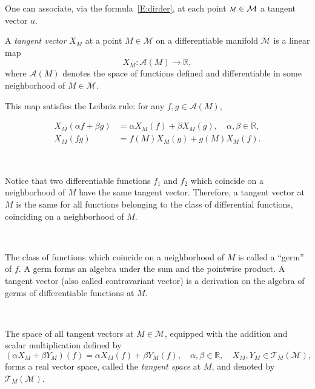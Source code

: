One can associate, via the formula~\eqref{E:dirder}, at each point ${\scriptstyle M}\in \mathcal{M}$ a tangent vector $u$.

\begin{definition}
A \emph{tangent vector} \( X_{\scriptstyle M} \) at a point \( {\scriptstyle M} \in \mathcal{M} \) on a differentiable manifold \( \mathcal{M} \) is a linear map  
\[
X_{\scriptstyle M} : \mathcal{A}({\scriptstyle M}) \to \mathbb{R},
\]  
where \( \mathcal{A}({\scriptstyle M}) \) denotes the space of functions defined and differentiable in some neighborhood of \( {\scriptstyle M} \in \mathcal{M} \).  

This map satisfies the Leibniz rule: for any \( f, g \in \mathcal{A}({\scriptstyle M}) \),  

\begin{equation}\label{E:Leibniz}
\begin{aligned}
X_M(\alpha f + \beta g) &= \alpha X_M (f) + \beta X_M (g), \quad \alpha, \beta \in \mathbb{R},\\
X_M (f g) &=  f(M) X_M (g) + g(M) X_M (f).
\end{aligned} 
\end{equation}
\end{definition}


\,

Notice that two differentiable functions $f_{1}$ and $f_{2}$ which coincide on a neighborhood of  ${\scriptstyle M}$ have the same  tangent vector. Therefore, a tangent vector at ${\scriptstyle M}$ is the same for all functions belonging to   the class of differential functions, coinciding on a neighborhood of ${\scriptstyle M}$.

\, 

The class of functions which coincide on a neighborhood of  ${\scriptstyle M}$ is called a ``germ'' of $f$. A germ forms an algebra under the sum and the pointwise product. A tangent vector (also called contravariant vector) is a derivation on the algebra of germs of differentiable functions at ${\scriptstyle M}$.

\, 
\begin{definition}
The space of all tangent vectors at \( {\scriptstyle M} \in \mathcal{M} \), equipped with the addition and scalar multiplication defined by  
\begin{equation}
(\alpha X_{\scriptstyle M} + \beta Y_{\scriptstyle M})(f) = \alpha X_{\scriptstyle M} (f) + \beta Y_{\scriptstyle M} (f),
\quad \alpha, \beta \in \mathbb{R}, \quad X_{\scriptstyle M}, Y_{\scriptstyle M} \in \mathcal{T}_{\scriptstyle M}(\mathcal{M}),
\end{equation}
forms a real vector space, called the \emph{tangent space} at \( {\scriptstyle M} \), and denoted by \( \mathcal{T}_{\scriptstyle M}(\mathcal{M}) \).  

\end{definition}

